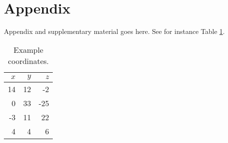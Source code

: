 \section{Appendix}

Appendix and supplementary material goes here. See for instance Table
\ref{tab:coordinates}.

\begin{table}[b]
\centering
\begin{tabular}{|rr|r|}
\hline
$x$ & $y$ & $z$ \\
\hline
14 & 12 & -2 \\
0 & 33 & -25 \\
-3 & 11 & 22 \\
4 & 4 & 6 \\
\hline
\end{tabular}
\caption{Example coordinates.}
\label{tab:coordinates}
\end{table}

